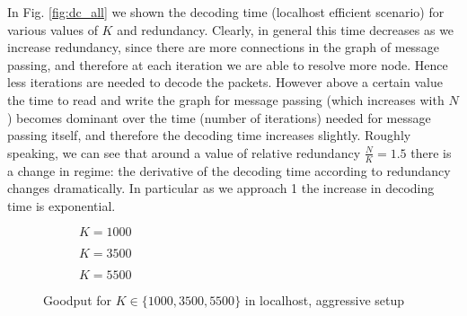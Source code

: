 In Fig. \ref{fig:dc_all} we shown the decoding time (localhost efficient scenario) for various values of $K$ and redundancy. Clearly, in general this time decreases as we increase redundancy, since there are more connections in the graph of message passing, and therefore at each iteration we are able to resolve more node. Hence less iterations are needed to decode the packets. However  above a certain value the time to read and write the graph for message passing (which increases with $N$) becomes dominant over the time (number of iterations) needed for message passing itself, and therefore the decoding time increases slightly. Roughly speaking, we can see that around a value of relative redundancy $\frac{N}{K}=1.5$ there is a change in regime: the derivative of the decoding time according to redundancy changes dramatically. In particular as we approach 1 the increase in decoding time is exponential.\\

\begin{figure}[t!]
\centering
\begin{subfigure}{0.24\textwidth}
	\captionsetup{justification=centering,font=scriptsize}
	\centering
	\setlength\fwidth{\textwidth}
	\setlength{}
	
	\caption{$K=1000$}
	\label{fig:lh_good_1000}
\end{subfigure}\hspace{2em}%
\begin{subfigure}{0.23\textwidth}
	\captionsetup{justification=centering,font=scriptsize}
	\centering
	\setlength\fwidth{\textwidth}
	\setlength{}
	
	\caption{$K=3500$}
	\label{fig:lh_good_3500}
\end{subfigure}\hspace{2em}%
\begin{subfigure}{0.23\textwidth}
	\captionsetup{justification=centering,font=scriptsize}
	\centering
	\setlength\fwidth{\textwidth}
	\setlength{}
	
	\caption{$K=5500$}
	\label{fig:lh_good_5500}
\end{subfigure}
\caption{Goodput for $K \in \{1000, 3500, 5500\}$ in localhost, aggressive setup}
\label{fig:goodput_aggr}
\end{figure}

